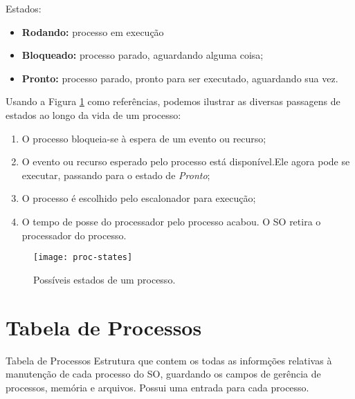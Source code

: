 Estados:
\begin{itemize}
  \item \textbf{Rodando:} processo em execução
  \item \textbf{Bloqueado:} processo parado, aguardando alguma coisa;
  \item \textbf{Pronto:} processo parado, pronto para ser executado, aguardando sua vez.
\end{itemize}

Usando a Figura \ref{fig:proc-states} como referências, podemos ilustrar as diversas passagens de estados ao longo da vida de um processo:

\begin{enumerate}
  \item O processo bloqueia-se à espera de um evento ou recurso;

  \item O evento ou recurso esperado pelo processo está disponível.Ele agora pode se executar, passando para o estado de \textit{Pronto};

  \item O processo é escolhido pelo escalonador para execução;

  \item O tempo de posse do processador pelo processo acabou. O SO retira o processador do processo.
\end{enumerate}

\begin{figure}[ht]
  \centering
  \texttt{[image: proc-states]}
  \caption{Possíveis estados de um processo.}
  \label{fig:proc-states}
\end{figure}

















\section{Tabela de Processos}
\begin{definicao}{Tabela de Processos}
  Estrutura que contem os todas as informções relativas à manutenção de cada processo do SO, guardando os campos de gerência de processos, memória e arquivos. Possui uma entrada para cada processo.
\end{definicao}

